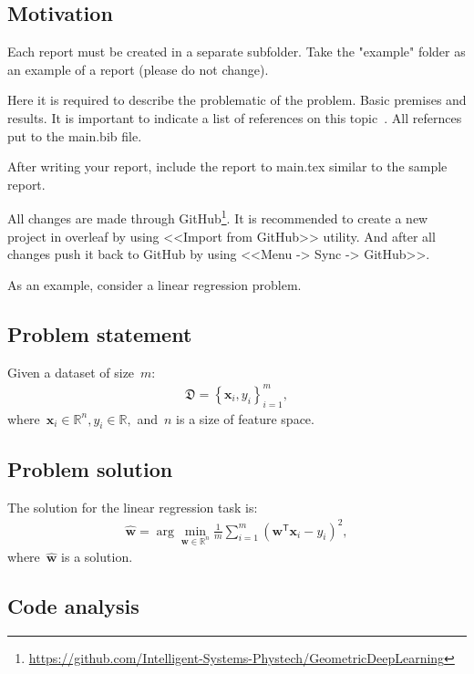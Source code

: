 \documentclass[../../main.tex]{subfiles}
\begin{document}
\subsection{Motivation}

Each report must be created in a separate subfolder. Take the "example" folder as an example of a report (please do not change).

Here it is required to describe the problematic of the problem. Basic premises and results. It is important to indicate a list of references on this topic~\cite{AuthorYear}. All refernces put to the main.bib file.

After writing your report, include the report to main.tex similar to the sample report.

All changes are made through GitHub\footnote{\url{https://github.com/Intelligent-Systems-Phystech/GeometricDeepLearning}}. It is recommended to create a new project in overleaf by using <<Import from GitHub>> utility. And after all changes push it back to GitHub by using <<Menu -> Sync -> GitHub>>.

As an example, consider a linear regression problem.

\subsection{Problem statement}

Given a dataset of size~$m$:
\[
\label{eq:example:1}
\begin{aligned}
    \mathfrak{D} = \left\{\mathbf{x}_i, y_i\right\}_{i=1}^{m},
\end{aligned}
\]
where~$\mathbf{x}_i \in \mathbb{R}^{n}, y_i \in \mathbb{R},$ and~$n$ is a size of feature space.

\subsection{Problem solution}

The solution for the linear regression task is:
\[
\label{eq:example:2}
\begin{aligned}
   \hat{\mathbf{w}} = \arg\min_{\mathbf{w}\in \mathbb{R}^{n}} \frac{1}{m}\sum_{i=1}^{m}\left(\textbf{w}^{\mathsf{T}}\textbf{x}_i - y_i\right)^2,
\end{aligned}
\]
where~$\hat{\mathbf{w}}$ is a solution.

\subsection{Code analysis}
\end{document}

